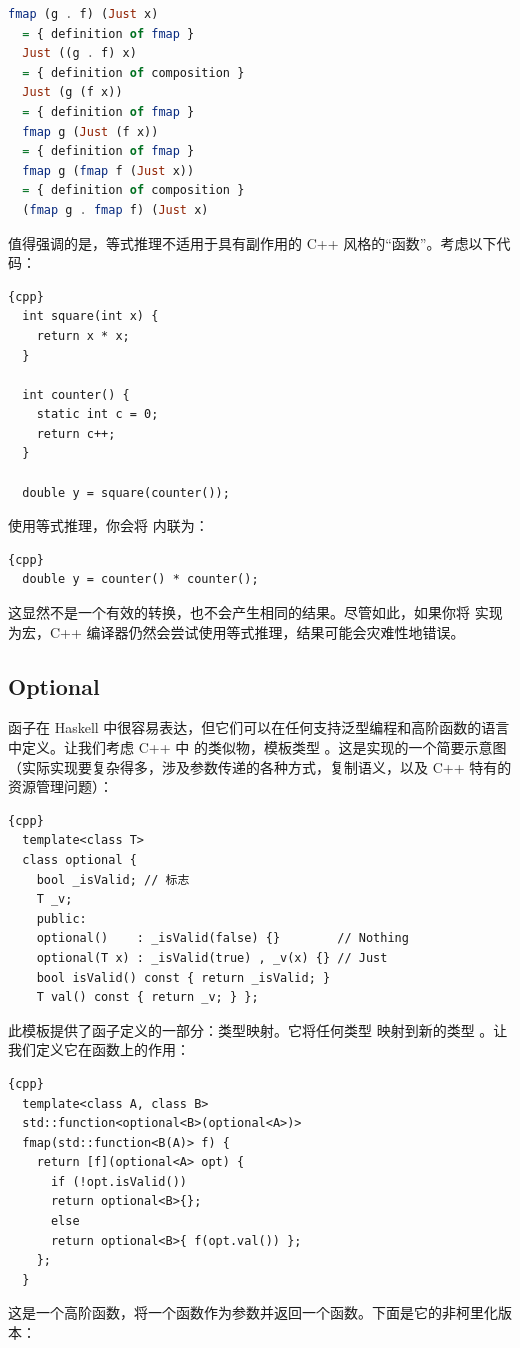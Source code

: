 \begin{lstlisting}[language=Haskell]
  fmap (g . f) (Just x)
  = { definition of fmap }
  Just ((g . f) x)
  = { definition of composition }
  Just (g (f x))
  = { definition of fmap }
  fmap g (Just (f x))
  = { definition of fmap }
  fmap g (fmap f (Just x))
  = { definition of composition }
  (fmap g . fmap f) (Just x)
\end{lstlisting}
值得强调的是，等式推理不适用于具有副作用的 C++ 风格的“函数”。考虑以下代码：

\begin{lstlisting}{cpp}
  int square(int x) {
    return x * x;
  }

  int counter() {
    static int c = 0;
    return c++;
  }

  double y = square(counter());
\end{lstlisting}
使用等式推理，你会将  内联为：

\begin{lstlisting}{cpp}
  double y = counter() * counter();
\end{lstlisting}
这显然不是一个有效的转换，也不会产生相同的结果。尽管如此，如果你将  实现为宏，C++ 编译器仍然会尝试使用等式推理，结果可能会灾难性地错误。

\subsection{Optional}

函子在 Haskell 中很容易表达，但它们可以在任何支持泛型编程和高阶函数的语言中定义。让我们考虑 C++ 中  的类似物，模板类型 。这是实现的一个简要示意图（实际实现要复杂得多，涉及参数传递的各种方式，复制语义，以及 C++ 特有的资源管理问题）：

\begin{lstlisting}{cpp}
  template<class T>
  class optional {
    bool _isValid; // 标志
    T _v;
    public:
    optional()    : _isValid(false) {}        // Nothing
    optional(T x) : _isValid(true) , _v(x) {} // Just
    bool isValid() const { return _isValid; }
    T val() const { return _v; } };
\end{lstlisting}
此模板提供了函子定义的一部分：类型映射。它将任何类型  映射到新的类型 。让我们定义它在函数上的作用：

\begin{lstlisting}{cpp}
  template<class A, class B>
  std::function<optional<B>(optional<A>)>
  fmap(std::function<B(A)> f) {
    return [f](optional<A> opt) {
      if (!opt.isValid())
      return optional<B>{};
      else
      return optional<B>{ f(opt.val()) };
    };
  }
\end{lstlisting}
这是一个高阶函数，将一个函数作为参数并返回一个函数。下面是它的非柯里化版本：

